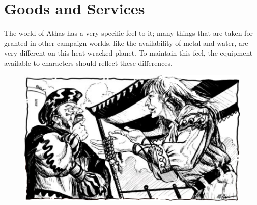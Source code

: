 \section{Goods and Services}
The world of Athas has a very specific feel to it; many things that are taken for granted in other campaign worlds, like the availability of metal and water, are very different on this heat-wracked planet. To maintain this feel, the equipment available to characters should reflect these differences.

\begin{figure}[t!]
\centering
\includegraphics[width=\textwidth]{images/merchant-1.png}
\WOTC
\end{figure}

